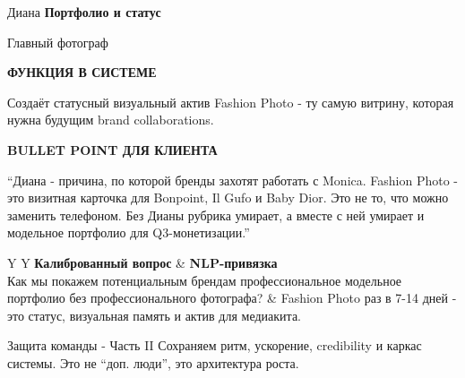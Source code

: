 \documentclass[11pt,a4paper]{article}
\newcommand{\minititle}[1]{{\sansfont\bfseries\fontsize{9.5}{11}\selectfont\color{rose}\MakeUppercase{#1}}}
\begin{document}
\begin{glassbox}
{\headingfont\fontsize{18}{20}\selectfont Диана}\hfill
{\sansfont\bfseries\color{emerald} Портфолио и статус}

{\color{muted} Главный фотограф}

\vspace{2mm}
\begin{softbox}[colback=paperbg]
\minititle{Функция в системе}\par
Создаёт статусный визуальный актив Fashion Photo - ту самую витрину, которая нужна будущим brand collaborations.
\end{softbox}
\vspace{2mm}
\begin{softbox}[colback=paperbg]
\minititle{Bullet Point для клиента}\par
``Диана - причина, по которой бренды захотят работать с Monica. Fashion Photo - это визитная карточка для Bonpoint, Il Gufo и Baby Dior. Это не то, что можно заменить телефоном. Без Дианы рубрика умирает, а вместе с ней умирает и модельное портфолио для Q3-монетизации.''
\end{softbox}
\vspace{2mm}
\begin{tabularx}{\linewidth}{Y Y}
\textbf{Калиброванный вопрос} & \textbf{NLP-привязка} \\
Как мы покажем потенциальным брендам профессиональное модельное портфолио без профессионального фотографа? & Fashion Photo раз в 7-14 дней - это статус, визуальная память и актив для медиакита. \\
\end{tabularx}
\end{glassbox}

\clearpage

\begin{glassbox}
{\headingfont\fontsize{22}{24}\selectfont Защита команды - Часть II}\hfill
{\color{muted}\sansfont\fontsize{9.5}{12}\selectfont Сохраняем ритм, ускорение, credibility и каркас системы. Это не ``доп. люди'', это архитектура роста.}
\end{glassbox}

\vspace{3mm}
\end{document}
